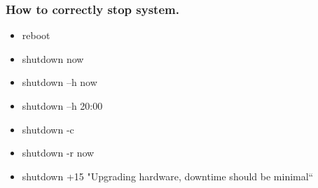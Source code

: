 \begin{frame}[fragile]
\frametitle{How to correctly stop system.}
    \begin{itemize}       
        \item reboot
        \item shutdown now
        \item shutdown –h now
        \item shutdown –h 20:00
        \item shutdown -c
        \item shutdown -r now
        \item shutdown +15 "Upgrading hardware, downtime should be minimal“
    \end{itemize}
\end{frame}
